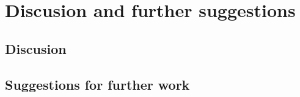 \chapter{Discusion and further suggestions}
\section{Discusion}
\section{Suggestions for further work}